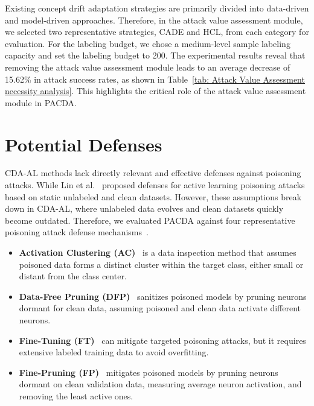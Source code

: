\documentclass[conference,compsoc]{IEEEtran} %
\begin{document}
Existing concept drift adaptation strategies are primarily divided into data-driven and model-driven approaches.
Therefore, in the attack value assessment module, we selected two representative strategies, CADE and HCL, from each category for evaluation. 
For the labeling budget, we chose a medium-level sample labeling capacity and set the labeling budget to 200.
The experimental results reveal that removing the attack value assessment module leads to an average decrease of 15.62\% in attack success rates, as shown in Table~\ref{tab: Attack Value Assessment necessity analysis}.
This highlights the critical role of the attack value assessment module in PACDA.

		\section{Potential Defenses}
\label{Sec: Potential Defenses}
CDA-AL methods lack directly relevant and effective defenses against poisoning attacks.
While Lin et al.~\cite{2021-GLOBALCOM-acctive-learning-under-malicious-mislabeling-poisoning-attacks} proposed defenses for active learning poisoning attacks based on static unlabeled and clean datasets. 
However, these assumptions break down in CDA-AL, where unlabeled data evolves and clean datasets quickly become outdated.
Therefore, we evaluated PACDA against four representative poisoning attack defense mechanisms~\cite{AC,DFP,FT,FP}.
\begin{itemize}[leftmargin=0.35cm] %
	\item \textbf{Activation Clustering (AC)}~\cite{AC} is a data inspection method that assumes poisoned data forms a distinct cluster within the target class, either small or distant from the class center. 

	\item \textbf{Data-Free Pruning (DFP)}~\cite{DFP} sanitizes poisoned models by pruning neurons dormant for clean data, assuming poisoned and clean data activate different neurons.

	\item \textbf{Fine-Tuning (FT)}~\cite{FT} can mitigate targeted poisoning attacks, but it requires extensive labeled training data to avoid overfitting.

	\item  \textbf{Fine-Pruning (FP)}~\cite{FP} mitigates poisoned models by pruning neurons dormant on clean validation data, measuring average neuron activation, and removing the least active ones. 
\end{itemize}
\end{document}
